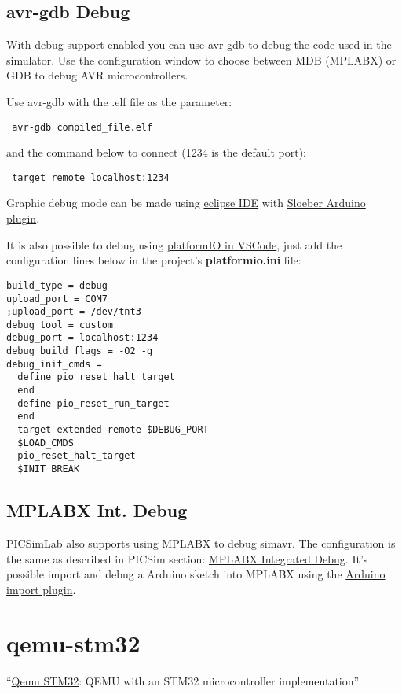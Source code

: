 \subsection{avr-gdb Debug} \hypertarget{def:gdbavr}{}
 
 With debug support enabled you can use avr-gdb to debug the code used in the simulator. 
 Use the configuration window to choose between MDB (MPLABX) or GDB to debug AVR microcontrollers. 
 
 
 Use avr-gdb with the .elf file as the parameter:
 \begin{verbatim}
 avr-gdb compiled_file.elf
 \end{verbatim}
 and the command below to connect (1234 is the default port):
 \begin{verbatim}
 target remote localhost:1234
 \end{verbatim}

Graphic debug mode can be made using \href{https://www.eclipse.org/}{eclipse IDE} with \href{https://eclipse.baeyens.it/}{Sloeber Arduino plugin}.

It is also possible to debug using \href{https://platformio.org/}{platformIO in VSCode}, just add the configuration lines below in the project's \textbf{platformio.ini} file:
\begin{verbatim}
build_type = debug
upload_port = COM7
;upload_port = /dev/tnt3
debug_tool = custom
debug_port = localhost:1234
debug_build_flags = -O2 -g
debug_init_cmds =
  define pio_reset_halt_target
  end
  define pio_reset_run_target
  end
  target extended-remote $DEBUG_PORT
  $LOAD_CMDS
  pio_reset_halt_target
  $INIT_BREAK
\end{verbatim}

\subsection{MPLABX Int. Debug }
PICSimLab also supports using MPLABX to debug simavr. The configuration is the same as described in PICSim section: \hyperlink{def:mplabxd}{MPLABX Integrated Debug}. 
It's possible import and debug a Arduino sketch into MPLABX using the \href{https://github.com/janegilruud/chipKIT-importer-2.0}{Arduino import plugin}.

 \section{qemu-stm32} \hypertarget{def:qemu-stm32}{}
 ``\href{http://beckus.github.io/qemu_stm32/}{Qemu STM32}: QEMU with an STM32 microcontroller implementation''
 
